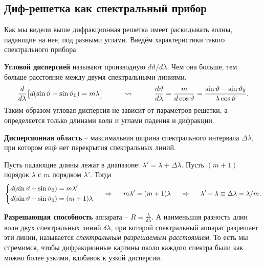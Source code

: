 \subsection{Диф-решетка как спектральный прибор}
Как мы видели выше дифракционная решетка имеет раскидывать волны, падающие на нее, под разными углами. Введём характеристики такого спектрального прибора.

\textbf{Угловой дисперсией} называют производную $d \vartheta/ d \lambda$. Чем она больше, тем больше расстояние между двумя спектральными линиями.
\begin{equation*}
	\frac{d}{d \lambda} \big[ d (\sin \vartheta - \sin \vartheta_0) = m \lambda \big]
	\hspace{1 cm}
	\leadsto
	\hspace{1 cm}
	\frac{d \vartheta}{d \lambda} = \frac{m}{d \cos \vartheta} = \frac{\sin \vartheta  - \sin \vartheta_0}{\lambda \cos \vartheta}.
\end{equation*}
Таким образом угловая дисперсия не зависит от параметров решетки, а определяется только длинами волн и углами падения и дифракции.

\textbf{Дисперсионная область} -- максимальная ширина спектрального интервала $\Delta \lambda$, при котором ещё нет перекрытия спектральных линий.

Пусть падающие длины лежат в диапазоне: $\lambda' = \lambda + \Delta \lambda$. Пусть $(m+1)$ порядок $\lambda$ с $m$ порядком  $\lambda'$.
Тогда
\begin{equation*}
	\left\{
	\begin{aligned}
		&d (\sin \vartheta - \sin \vartheta_0) = m \lambda'\\
		&d (\sin \vartheta - \sin \vartheta_0) = (m+1) \lambda	
	\end{aligned}
	\right.
	\hspace{0.5 cm}
	\Rightarrow
	\hspace{0.5 cm}
	m \lambda' = (m+1) \lambda
	\hspace{0.5 cm}
	\Rightarrow
	\hspace{0.5 cm}
	\lambda' - \lambda \equiv \Delta \lambda = \lambda/m.
\end{equation*}

\textbf{Разрешающая способность} аппарата -- $R = \frac{\lambda}{\delta \lambda}$. А наименьшая разность длин волн двух спектральных линий $\delta\lambda$, при которой спектральный аппарат разрешает эти линии, называется \textit{спектральным разрешаемым расстоянием}.
То есть мы стремимся, чтобы дифракционные картины около каждого спектра были как можно более узкими, вдобавок к узкой дисперсии.

